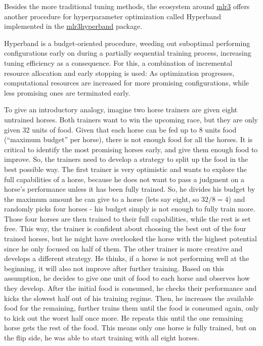 \documentclass[
]{scrbook}
\begin{document}
Besides the more traditional tuning methods, the ecosystem around \href{https://mlr3.mlr-org.com}{mlr3} offers another procedure for hyperparameter optimization called Hyperband implemented in the \href{https://mlr3hyperband.mlr-org.com}{mlr3hyperband} package.

Hyperband is a budget-oriented procedure, weeding out suboptimal performing configurations early on during a partially sequential training process, increasing tuning efficiency as a consequence.
For this, a combination of incremental resource allocation and early stopping is used: As optimization progresses, computational resources are increased for more promising configurations, while less promising ones are terminated early.

To give an introductory analogy, imagine two horse trainers are given eight untrained horses.
Both trainers want to win the upcoming race, but they are only given 32 units of food.
Given that each horse can be fed up to 8 units food (``maximum budget'' per horse), there is not enough food for all the horses.
It is critical to identify the most promising horses early, and give them enough food to improve.
So, the trainers need to develop a strategy to split up the food in the best possible way.
The first trainer is very optimistic and wants to explore the full capabilities of a horse, because he does not want to pass a judgment on a horse's performance unless it has been fully trained.
So, he divides his budget by the maximum amount he can give to a horse (lets say eight, so \(32 / 8 = 4\)) and randomly picks four horses - his budget simply is not enough to fully train more.
Those four horses are then trained to their full capabilities, while the rest is set free.
This way, the trainer is confident about choosing the best out of the four trained horses, but he might have overlooked the horse with the highest potential since he only focused on half of them.
The other trainer is more creative and develops a different strategy.
He thinks, if a horse is not performing well at the beginning, it will also not improve after further training.
Based on this assumption, he decides to give one unit of food to each horse and observes how they develop.
After the initial food is consumed, he checks their performance and kicks the slowest half out of his training regime.
Then, he increases the available food for the remaining, further trains them until the food is consumed again, only to kick out the worst half once more.
He repeats this until the one remaining horse gets the rest of the food.
This means only one horse is fully trained, but on the flip side, he was able to start training with all eight horses.
\end{document}
